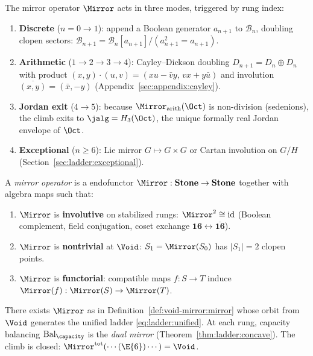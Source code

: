 \begin{definition}\label{def:void-mirror:modes}
The mirror operator $\Mirror$ acts in three modes, triggered by rung index:
\begin{enumerate}[label=\textbf{M\arabic*.},leftmargin=*]
  \item \textbf{Discrete} ($n=0\to1$): append a Boolean generator $a_{n+1}$ to
    $\mathcal{B}_n$, doubling clopen sectors:
    $\mathcal{B}_{n+1}=\mathcal{B}_n[a_{n+1}]/(a_{n+1}^2=a_{n+1})$.
  \item \textbf{Arithmetic} ($1\to2\to3\to4$): Cayley--Dickson doubling
    $D_{n+1}=D_n\oplus D_n$ with product
    $(x,y)\cdot(u,v)=(xu-\bar v y,\,vx+y\bar u)$ and involution
    $\overline{(x,y)}=(\bar x,-y)$ (Appendix~\ref{sec:appendix:cayley}).
  \item \textbf{Jordan exit} ($4\to5$): because $\Mirror_{\mathrm{arith}}(\Oct)$
    is non-division (sedenions), the climb exits to
    $\jalg=H_3(\Oct)$, the unique formally real Jordan envelope of $\Oct$.
  \item \textbf{Exceptional} ($n\geq6$): Lie mirror
    $G\mapsto G\times G$ or Cartan involution on $G/H$
    (Section~\ref{sec:ladder:exceptional}).
\end{enumerate}
\end{definition}

\begin{definition}\label{def:void-mirror:mirror}
A \emph{mirror operator} is a endofunctor
$\Mirror:\mathbf{Stone}\to\mathbf{Stone}$ together with algebra maps such that:
\begin{enumerate}[label=(\roman*),leftmargin=*]
  \item $\Mirror$ is \textbf{involutive} on stabilized rungs:
    $\Mirror^2\cong\mathrm{id}$ (Boolean complement, field conjugation, coset
    exchange $\mathbf{16}\leftrightarrow\overline{\mathbf{16}}$).
  \item $\Mirror$ is \textbf{nontrivial} at $\Void$:
    $S_1=\Mirror(S_0)$ has $|S_1|=2$ clopen points.
  \item $\Mirror$ is \textbf{functorial}: compatible maps $f:S\to T$ induce
    $\Mirror(f):\Mirror(S)\to\Mirror(T)$.
\end{enumerate}
\end{definition}

\begin{axiom}[Mirror]\label{ax:void-mirror:mirror}
There exists $\Mirror$ as in Definition~\ref{def:void-mirror:mirror} whose
orbit from $\Void$ generates the unified ladder \eqref{eq:ladder:unified}. At
each rung, capacity balancing $\mathrm{Bal}_\capacity$ is the \emph{dual
mirror} (Theorem~\ref{thm:ladder:concave}). The climb is closed:
$\Mirror^{\mathrm{tot}}(\cdots(\E{6})\cdots)=\Void$.
\end{axiom}

